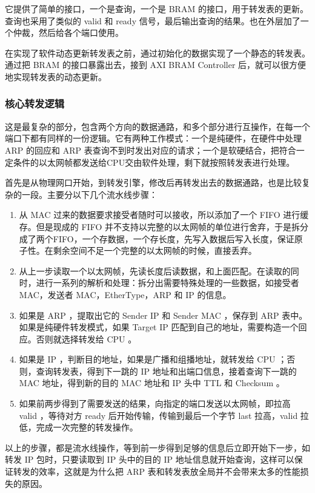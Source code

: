 \documentclass{ctexart}
\begin{document}
  它提供了简单的接口，一个是查询，一个是 BRAM 的接口，用于转发表的更新。查询也采用了类似的 valid 和 ready 信号，最后输出查询的结果。也在外层加了一个仲裁，然后给各个端口使用。

  在实现了软件动态更新转发表之前，通过初始化的数据实现了一个静态的转发表。通过把 BRAM 的接口暴露出去，接到 AXI BRAM Controller 后，就可以很方便地实现转发表的动态更新。

\subsubsection{核心转发逻辑}
  这是最复杂的部分，包含两个方向的数据通路，和多个部分进行互操作，在每一个端口下都有同样的一份逻辑。它有两种工作模式：一个是纯硬件，在硬件中处理 ARP 的回应和 ARP 表查询不到时发出对应的请求；一个是软硬结合，把符合一定条件的以太网帧都发送给CPU交由软件处理，剩下就按照转发表进行处理。

  首先是从物理网口开始，到转发引擎，修改后再转发出去的数据通路，也是比较复杂的一段。主要分以下几个流水线步骤：

  \begin{enumerate}
    \item 从 MAC 过来的数据要求接受者随时可以接收，所以添加了一个 FIFO 进行缓存。但是现成的 FIFO 并不支持以完整的以太网帧的单位进行舍弃，于是拆分成了两个FIFO，一个存数据，一个存长度，先写入数据后写入长度，保证原子性。在剩余空间不足一个完整的以太网帧的时候，直接丢弃。
    \item 从上一步读取一个以太网帧，先读长度后读数据，和上面匹配。在读取的同时，进行一系列的解析和处理：拆分出需要特殊处理的一些数据，如接受者 MAC，发送者 MAC，EtherType，ARP 和 IP 的信息。
    \item 如果是 ARP ，提取出它的 Sender IP 和 Sender MAC ，保存到 ARP 表中。如果是纯硬件转发模式，如果 Target IP 匹配到自己的地址，需要构造一个回应。否则就选择转发给 CPU 。
    \item 如果是 IP ，判断目的地址，如果是广播和组播地址，就转发给 CPU ；否则，查询转发表，得到下一跳的 IP 地址和出端口信息，接着查询下一跳的 MAC 地址，得到新的目的 MAC 地址和 IP 头中 TTL 和 Checksum 。
    \item 如果前两步得到了需要发送的结果，向指定的端口发送以太网帧，即拉高 valid ，等待对方 ready 后开始传输，传输到最后一个字节 last 拉高，valid 拉低，完成一次完整的转发操作。
  \end{enumerate}

  以上的步骤，都是流水线操作，等到前一步得到足够的信息后立即开始下一步，如转发 IP 包时，只要读取到 IP 头中的目的 IP 地址信息就开始查询，这样可以保证转发的效率，这就是为什么把 ARP 表和转发表放全局并不会带来太多的性能损失的原因。
\end{document}
